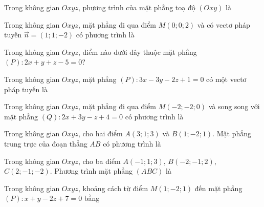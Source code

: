 \luyentap
{}
\begin{bai}Trong không gian $Oxyz$, phương trình của mặt phẳng toạ độ $(Oxy)$ là
\end{bai}
\begin{bai}Trong không gian $Oxyz$, mặt phẳng đi qua điểm $M(0;0;2)$ và có vectơ pháp tuyến $\vec n=(1;1;-2)$ có phương trình là
\end{bai}
\begin{bai}Trong không gian $Oxyz$, điểm nào dưới đây thuộc mặt phẳng $(P)\colon 2x+y+z-5=0$?
\end{bai}
\begin{bai}Trong không gian $Oxyz$, mặt phẳng $(P)\colon 3x-3y-2z+1=0$ có một vectơ pháp tuyến là
\end{bai}
\begin{bai}Trong không gian $Oxyz$, mặt phẳng đi qua điểm $M(-2;-2;0)$ và song song với mặt phẳng $(Q)\colon 2x+3y-z+4=0$ có phương trình là
\end{bai}
\begin{bai}Trong không gian $Oxyz$, cho hai điểm $A(3;1;3)$ và $B(1;-2;1)$. Mặt phẳng trung trực của đoạn thẳng $AB$ có phương trình là
\end{bai}
\begin{bai}Trong không gian $Oxyz$, cho ba điểm $A(-1;1;3)$, $B(-2;-1;2)$, $C(2;-1;-2)$. Phương trình mặt phẳng $(ABC)$ là
\end{bai}
\begin{bai}Trong không gian $Oxyz$, khoảng cách từ điểm $M(1;-2;1)$ đến mặt phẳng $(P)\colon x+y-2z+7=0$ bằng
\end{bai}
